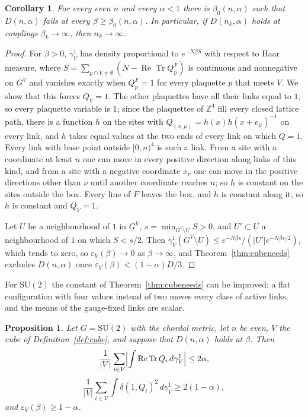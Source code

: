 \documentclass[aps,prd,twocolumn,superscriptaddress,nofootinbib,longbibliography,floatfix,amsmath,amssymb,10pt]{revtex4-2}
\newtheorem{proposition}[theorem]{Proposition}
\newtheorem{corollary}[theorem]{Corollary}
\theoremstyle{definition}
\theoremstyle{remark}
\newcommand{\Z}{\mathbb{Z}}
\newcommand{\SU}{\mathrm{SU}}
\newcommand{\ReTr}{\operatorname{Re}\operatorname{Tr}}
\begin{document}
\begin{corollary}\label{cor:cubefails}
For every even $n$ and every $\alpha<1$ there is $\beta_0(n,\alpha)$ such that
$D(n,\alpha)$ fails at every $\beta\ge\beta_0(n,\alpha)$. In particular, if
$D(n_k,\alpha)$ holds at couplings $\beta_k\to\infty$, then $n_k\to\infty$.
\end{corollary}

\begin{proof}
For $\beta>0$, $\gamma^1_V$ has density proportional to $e^{-N\beta S}$ with
respect to Haar measure, where $S=\sum_{p\cap V\ne\emptyset}(N-\ReTr Q^F_p)$
is continuous and nonnegative on $G^V$ and vanishes exactly when $Q^F_p=1$
for every plaquette $p$ that meets $V$. We show that this forces $Q_V=1$.
The other plaquettes have all their links equal to $1$, so every plaquette
variable is $1$; since the plaquettes of $\Z^4$ fill every closed lattice
path, there is a function $h$ on the sites with $Q_{(x,\mu)}=h(x)h(x+e_\mu)^{-1}$
on every link, and $h$ takes equal values at the two ends of every link on
which $Q=1$. Every link with base point outside $[0,n)^4$ is such a link. From
a site with a coordinate at least $n$ one can move in every positive
direction along links of this kind, and from a site with a negative
coordinate $x_\nu$ one can move in the positive directions other than $\nu$
until another coordinate reaches $n$; so $h$ is constant on the sites outside
the box. Every line of $F$ leaves the box, and $h$ is constant along it, so
$h$ is constant and $Q_V=1$.

Let $U$ be a neighbourhood of $1$ in $G^V$, $s=\min_{G^V\setminus U}S>0$, and
$U'\subset U$ a neighbourhood of $1$ on which $S<s/2$. Then
$\gamma^1_V(G^V\setminus U)\le e^{-N\beta s}/(|U'|e^{-N\beta s/2})$, which
tends to zero, so $\varepsilon_V(\beta)\to0$ as $\beta\to\infty$, and
Theorem~\ref{thm:cubeneeds} excludes $D(n,\alpha)$ once
$\varepsilon_V(\beta)<(1-\alpha)D/3$.
\end{proof}

For $\SU(2)$ the constant of Theorem~\ref{thm:cubeneeds} can be improved: a
flat configuration with four values instead of two moves every class of
active links, and the means of the gauge-fixed links are scalar.

\begin{proposition}\label{prop:tetra}
Let $G=\SU(2)$ with the chordal metric, let $n$ be even, $V$ the cube of
Definition~\ref{def:cube}, and suppose that $D(n,\alpha)$ holds at $\beta$.
Then
\[
\frac1{|V|}\sum_{i\in V}\Bigl|\int\ReTr Q_i\,d\gamma^1_V\Bigr|\le2\alpha,
\]
\[
\frac1{|V|}\sum_{i\in V}\int\delta(1,Q_i)^2\,d\gamma^1_V\ge2(1-\alpha),
\]
and $\varepsilon_V(\beta)\ge1-\alpha$.
\end{proposition}
\end{document}
